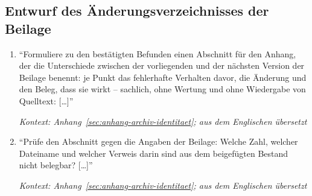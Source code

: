 \subsection{Entwurf des Änderungsverzeichnisses der Beilage}
\label{sec:prompts-kimi-changelog}
\begin{enumerate}
    \item \enquote{Formuliere zu den bestätigten Befunden einen Abschnitt für
            den Anhang, der die Unterschiede zwischen der vorliegenden und der
            nächsten Version der Beilage benennt: je Punkt das fehlerhafte
            Verhalten davor, die Änderung und den Beleg, dass sie wirkt --
            sachlich, ohne Wertung und ohne Wiedergabe von Quelltext:
            [\dots]}
            \par\hfill\textit{Kontext:
            Anhang~\ref{sec:anhang-archiv-identitaet}; aus dem Englischen
            übersetzt}

    \item \enquote{Prüfe den Abschnitt gegen die Angaben der Beilage: Welche
            Zahl, welcher Dateiname und welcher Verweis darin sind aus dem
            beigefügten Bestand nicht belegbar? [\dots]}
            \par\hfill\textit{Kontext:
            Anhang~\ref{sec:anhang-archiv-identitaet}; aus dem Englischen
            übersetzt}
\end{enumerate}

